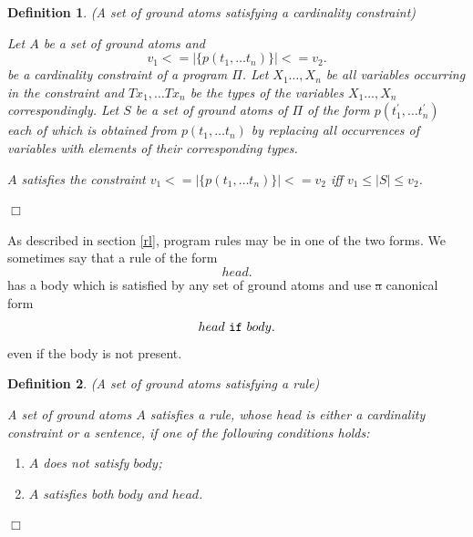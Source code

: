 \documentclass[a4paper,10pt]{article}
\newtheorem{definition}{Definition}
\providecommand{\DIFaddtex}[1]{{\protect\color{blue}\uwave{#1}}} %
\providecommand{\DIFdeltex}[1]{{\protect\color{red}\sout{#1}}}                      %
\providecommand{\DIFaddbegin}{} %
\providecommand{\DIFaddend}{} %
\providecommand{\DIFdelbegin}{} %
\providecommand{\DIFdelend}{} %
\providecommand{\DIFadd}[1]{\texorpdfstring{\DIFaddtex{#1}}{#1}} %
\providecommand{\DIFdel}[1]{\texorpdfstring{\DIFdeltex{#1}}{}} %
\begin{document}
\begin{definition}(A set of ground atoms satisfying a cardinality constraint)\\
\rm{
Let $A$ be a set of ground atoms and $$v_1 <= |\{p(t_1,\ldots t_n)\}| <= v_2.$$ be a cardinality constraint of a program $\Pi$.
Let $X_1\ldots,X_n$ be all variables occurring in the constraint and $Tx_1,\ldots Tx_n$ be the types of the variables $X_1\ldots,X_n$ correspondingly. Let $S$ be a set of ground atoms of $\Pi$ of the form $p(t_1^\prime,\ldots t_n^\prime)$ each of which is obtained from $p(t_1,\ldots t_n)$ by replacing all occurrences of variables  with elements of their corresponding types.

\noindent\medskip
$A$ satisfies  the constraint $v_1 <= |\{p(t_1,\ldots t_n)\}| <= v_2$ iff $v_1 \le |S| \le v_2$. 

\hfill$\Box$

}
\end{definition}


As described in section \ref{rl}, program rules may be in one of the two forms. We sometimes say that a rule of the form $$head.$$ has a body which is satisfied by any set of ground atoms and use \DIFdelbegin \DIFdel{a }\DIFdelend \DIFaddbegin \DIFadd{the }\DIFaddend canonical form $$head~\mbox{\texttt{if}}~body.$$ even if the body is not present.



\begin{definition}(A set of ground atoms satisfying a rule)\\
\DIFdelbegin %
\DIFdelend \DIFaddbegin \rm{
A set of ground atoms $A$ satisfies a rule, whose head is either a cardinality constraint or a sentence, if one of the following conditions holds:
\begin{enumerate}
\item $A$ does not satisfy $body$;
\item $A$ satisfies both $body$ and $head$.
\end{enumerate}
}
\DIFaddend \hfill $\Box$
\end{definition}
\end{document}
